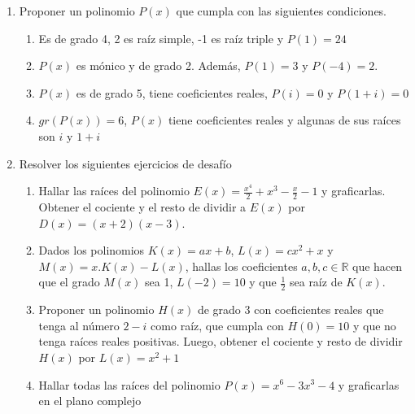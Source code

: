\documentclass[a4paper]{article}
\newcommand{\exercise}{\item}
\newcommand{\df}[2]{\displaystyle\frac{#1}{#2}}
\begin{document}
\begin{enumerate}
	\begin{multicols}{2}
	\begin{enumerate} [label=(\alph*)]
		\item $x^2+\sqrt{3}x-1$
		\item $8x^3-28x^2+14x+15$
		\item $x^5-1$
		\item $x^5+3x^4+3x^3+3x^2+2x$
		\item $x^4-\df{9}{2}x^3+21x-10$
		\item $x^7+18x^6+81x^5$
		\item $x^4-2x^2+2$
		\item $x^6-x^4-20x^2$
		\item $x^7-x$
		\item $x^6+3x^3-4$
	\end{enumerate}
	\end{multicols}
	\exercise Proponer un polinomio $P(x)$ que cumpla con las siguientes condiciones.
	\begin{multicols}{2}
	\begin{enumerate} [label=(\alph*)]
		\item Es de grado 4, 2 es raíz simple, -1 es raíz triple y $P(1)=24$
		\item $P(x)$ es mónico y de grado 2. Además, $P(1)=3$ y $P(-4)=2$.
		\item $P(x)$ es de grado 5, tiene coeficientes reales, $P(i)=0$ y $P(1+i)=0$
		\item $gr\left(P(x)\right)=6$, $P(x)$ tiene coeficientes reales y algunas de sus raíces son $i$ y $1+i$
	\end{enumerate}
	\end{multicols}
	\exercise Resolver los siguientes ejercicios de desafío
	\begin{enumerate} [label=(\alph*)]
		\item Hallar las raíces del polinomio $E(x)=\df{x^4}{2}+x^3-\df{x}{2}-1$ y graficarlas. Obtener el cociente y el resto de dividir a $E(x)$ por $D(x)=(x+2)(x-3)$.
		\item Dados los polinomios $K(x)=ax+b$, $L(x)=cx^2+x$ y $M(x)=x.K(x)-L(x)$, hallas los coeficientes $a,b,c \in \mathbb{R}$ que hacen que el grado $M(x)$ sea 1, $L(-2)=10$ y que $\df{1}{2}$ sea raíz de $K(x)$.
		\item Proponer un polinomio $H(x)$ de grado 3 con coeficientes reales que tenga al número $2-i$ como raíz, que cumpla con $H(0)=10$ y que no tenga raíces reales positivas. Luego, obtener el cociente y resto de dividir $H(x)$ por $L(x)=x^2+1$
		\item Hallar todas las raíces del polinomio $P(x)=x^6-3x^3-4$ y graficarlas en el plano complejo

\end{enumerate}
\end{enumerate}
\end{document}
